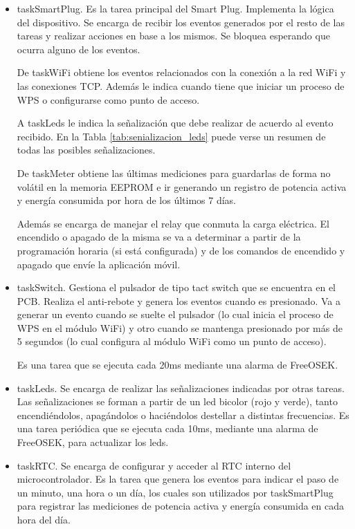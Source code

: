 \begin{itemize}
\item taskSmartPlug. Es la tarea principal del Smart Plug. Implementa la lógica del dispositivo. Se encarga de recibir los eventos generados por el resto de las tareas y realizar acciones en base a los mismos. Se bloquea esperando que ocurra alguno de los eventos. 

De taskWiFi obtiene los eventos relacionados con la conexión a la red WiFi y las conexiones TCP. Además le indica cuando tiene que iniciar un proceso de WPS o configurarse como punto de acceso.

A taskLeds le indica la señalización que debe realizar de acuerdo al evento recibido. En la Tabla \ref{tab:senializacion_leds} puede verse un resumen de todas las posibles señalizaciones.

De taskMeter obtiene las últimas mediciones para guardarlas de forma no volátil en la memoria EEPROM e ir generando un registro de potencia activa y energía consumida por hora de los últimos 7 días.

Además se encarga de manejar el relay que conmuta la carga eléctrica. El encendido o apagado de la misma se va a determinar a partir de la programación horaria (si está configurada) y de los comandos de encendido y apagado que envíe la aplicación móvil.

\item taskSwitch. Gestiona el pulsador de tipo tact switch que se encuentra en el PCB. Realiza el anti-rebote y genera los eventos cuando es presionado. Va a generar un evento cuando se suelte el pulsador (lo cual inicia el proceso de WPS en el módulo WiFi) y otro cuando se mantenga presionado por más de 5 segundos (lo cual configura al módulo WiFi como un punto de acceso). 

Es una tarea que se ejecuta cada 20ms mediante una alarma de FreeOSEK.


\item taskLeds. Se encarga de realizar las señalizaciones indicadas por otras tareas. Las señalizaciones se forman a partir de un led bicolor (rojo y verde), tanto encendiéndolos, apagándolos o haciéndolos destellar a distintas frecuencias.
Es una tarea periódica que se ejecuta cada 10ms, mediante una alarma de FreeOSEK, para actualizar los leds.


\item taskRTC. Se encarga de configurar y acceder al RTC interno del microcontrolador. Es la tarea que genera los eventos para indicar el paso de un minuto, una hora o un día, los cuales son utilizados por taskSmartPlug para registrar las mediciones de potencia activa y energía consumida en cada hora del día.


\end{itemize}
